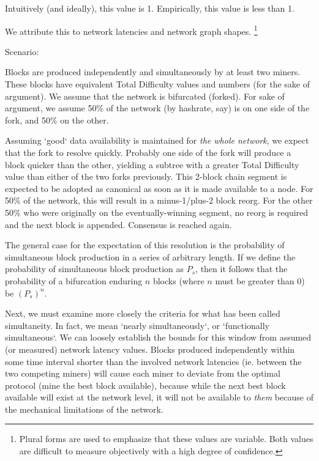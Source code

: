 \documentclass[11pt]{article}
\theoremstyle{plain}
\begin{document}
Intuitively (and ideally), this value is 1. 
Empirically, this value is less than 1.

We attribute this to network latencies and network graph shapes.\nolinebreak
\footnote{
Plural forms are used to emphasize that these values are variable.
Both values are difficult to measure objectively with a high degree of
confidence.
}

Scenario:

Blocks are produced independently and simultaneously by at least two miners.
These blocks have equivalent Total Difficulty values and numbers (for the sake
of argument).
We assume that the network is bifurcated (forked). For sake of argument, we
assume 50\% of the network (by hashrate, say) is on one side of the fork, and
50\% on the other.

Assuming `good` data availability is maintained for \textit{the whole network},
we expect that the fork to resolve quickly.
Probably one side of the fork will produce a block quicker than the other,
yielding a subtree with a greater Total Difficulty value than either of the two
forks previously.
This 2-block chain segment is expected to be adopted as canonical as soon as it
is made available to a node.
For 50\% of the network, this will result in a minus-1/plus-2 block reorg. For
the other 50\% who were originally on the eventually-winning segment, no reorg
is required and the next block is appended. Consensus is reached again.

The general case for the expectation of this resolution is the probability of
simultaneous block production in a series of arbitrary length.
If we define the probability of simultaneous block production as $P_s$,
then it follows that the probability of a bifurcation enduring $n$ blocks
(where $n$ must be greater than 0) be $(P_{s})^{n}$.

Next, we must examine more closely the criteria for what has been called
simultaneity.
In fact, we mean `nearly simultaneously`, or `functionally simultaneous`.
We can loosely establish the bounds for this window from assumed (or measured)
network latency values.
Blocks produced independently within some time interval shorter than the
involved network latencies (ie. between the two competing miners)
will cause each miner to deviate from the optimal protocol (mine the best block
available), because while the next best block available will exist at the
network level,
it will not be available to \textit{them} because of the mechanical limitations
of the network.
\end{document}
